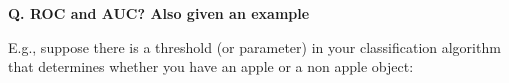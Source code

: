 \begin{frame}[fragile]{\textbf{Q. ROC and AUC? Also given an example}}
  \begin{wideitemize}
    \item E.g., suppose there is a threshold (or parameter) in your
      classification algorithm that determines whether you have an apple or a
      non apple object:\medskip
      \begin{flushleft}
      \end{flushleft}
  \end{wideitemize}
\end{frame}


